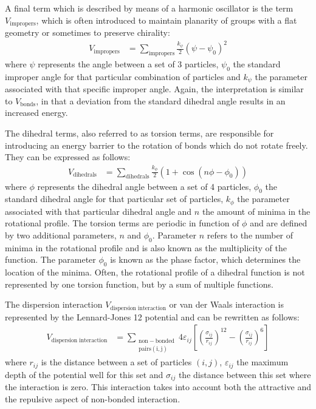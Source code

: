 \documentclass[conference]{IEEEtran}
\begin{document}
A final term which is described by means of a harmonic oscillator is the term $V_{\mathrm{impropers}}$, which is 
often introduced to  maintain planarity of groups with a flat geometry or sometimes to preserve chirality:
\begin{equation}
    \begin{aligned}
    V_{\mathrm{impropers}} &= \sum_{\mathrm{impropers}} \frac{k_{\psi}}{2}{(\psi-\psi_0)}^2
    \end{aligned}
\end{equation}
where $\psi$ represents the angle between a set of 3 particles, $\psi_0$ the standard improper angle for that 
particular combination of particles and $k_{\psi}$ the parameter associated with that specific improper angle. 
Again, the interpretation is similar to $V_{\mathrm{bonds}}$, in that a deviation from the standard dihedral 
angle results in an increased energy.

The dihedral terms, also referred to as torsion terms, are responsible for introducing an energy barrier to the 
rotation of bonds which do not rotate freely. They can be expressed as follows:
\begin{equation}
    \begin{aligned}
    V_{\mathrm{dihedrals}} &= \sum_{\mathrm{dihedrals}} \frac{k_{\phi}}{2}(1+\cos(n\phi-\phi_0))
    \end{aligned}
\end{equation}
where $\phi$ represents the dihedral angle between a set of 4 particles, $\phi_0$ the standard dihedral angle for 
that particular set of particles, $k_{\phi}$ the parameter associated with that particular dihedral angle and $n$ 
the amount of minima in the rotational profile. The torsion terms are periodic in function of $\phi$ and are 
defined by two additional parameters, $n$ and $\phi_0$. Parameter $n$ refers to the number of minima in the 
rotational profile and is also known as the multiplicity of the function. The parameter $\phi_0$ is known as 
the phase factor, which determines the location of the minima. Often, the rotational profile of a dihedral 
function is not represented by one torsion function, but by a sum of multiple functions. 

The dispersion interaction $V_{\mathrm{dispersion \; interaction}}$ or van der Waals interaction is represented by 
the Lennard-Jones 12 potential and can be rewritten as follows:
\begin{equation}
    \begin{aligned}
    V_{\mathrm{dispersion \; interaction}} &= \sum_{\mathrm{\substack{\mathrm{non-bonded} \\ \mathrm{pairs(i,j)}}}} 4\varepsilon_{ij}\left[
    {\left(\frac{\sigma_{ij}}{r_{ij}}\right)}^{12} - {\left(\frac{\sigma_{ij}}{r_{ij}}\right)}^6
    \right]
    \end{aligned}
\end{equation}
where $r_{ij}$ is the distance between a set of particles $(i,j)$, $\varepsilon_{ij}$ the maximum depth of the 
potential well for this set and $\sigma_{ij}$ the distance between this set where the interaction is zero. This 
interaction takes into account both the attractive and the repulsive aspect of non-bonded interaction. 
\end{document}
